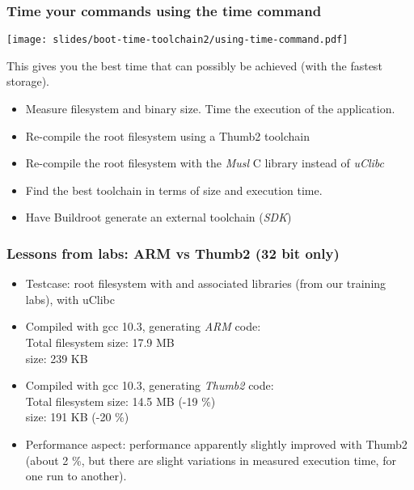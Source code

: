 \begin{frame}
\frametitle{Time your commands using the time command}
\begin{center}
\texttt{[image: slides/boot-time-toolchain2/using-time-command.pdf]}
\end{center}
This gives you the best time that can possibly be achieved (with the fastest storage).
\end{frame}

{
\begin{itemize}
\item Measure filesystem and  binary size. Time
      the execution of the application.
\item Re-compile the root filesystem using a Thumb2 toolchain
\item Re-compile the root filesystem with the {\em Musl}
      C library instead of {\em uClibc}
\item Find the best toolchain in terms of size and execution time.
\item Have Buildroot generate an external toolchain ({\em SDK})
\end{itemize}
}


\begin{frame}
\frametitle{Lessons from labs: ARM vs Thumb2 (32 bit only)}
\begin{itemize}
\item Testcase: root filesystem with  and associated
      libraries (from our training labs), with uClibc
\item Compiled with gcc 10.3, generating {\em ARM} code:\\
      Total filesystem size: 17.9 MB\\
       size: 239 KB
\item Compiled with gcc 10.3, generating {\em Thumb2} code:\\
      Total filesystem size: 14.5 MB (-19 \%)\\
       size: 191 KB (-20 \%)
\item Performance aspect: performance apparently slightly improved with Thumb2
      (about 2 \%, but there are slight variations in measured
      execution time, for one run to another).
\end{itemize}
\end{frame}

